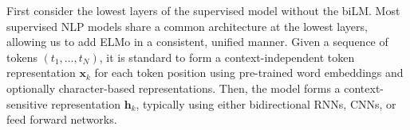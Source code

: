 \documentclass[11pt,a4paper]{article}
\newcommand{\ELMO}{ELMo}
\begin{document}

First consider the lowest layers of the supervised model without the biLM.
Most supervised NLP models share a common architecture at the lowest layers, allowing us to add \ELMO{} in a consistent, unified manner.
Given a sequence of tokens $(t_1, \ldots, t_N)$, it is standard to form a context-independent token representation $\mathbf{x}_k$ for each token position using pre-trained word embeddings and optionally character-based representations.
Then, the model forms a context-sensitive representation
$\mathbf{h}_k$, typically using either bidirectional RNNs, CNNs, or feed forward networks.


\end{document}
